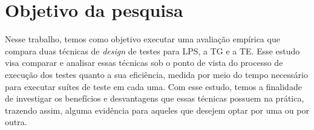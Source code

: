 \section{Objetivo da pesquisa}
\label{sec:objetivos}
Nesse trabalho, temos como objetivo executar uma avaliação empírica que compara
duas técnicas de \emph{design} de testes para LPS, a TG e a TE. Esse estudo visa
comparar e analisar essas técnicas sob o ponto de vista do processo de execução
dos testes quanto a sua eficiência, medida por meio do tempo necessário para
executar suítes de teste em cada uma. Com esse estudo, temos a finalidade de
investigar os benefícios e desvantagens que essas técnicas possuem na prática,
trazendo assim, alguma evidência para aqueles que desejem optar por uma ou por
outra.
